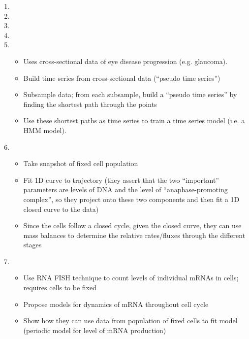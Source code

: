 \documentclass[12pt]{article}
\begin{document}
\begin{enumerate}

\item {}

\item {}

\item {}

\item {}

\item {}
\begin{itemize}
	\item Uses cross-sectional data of eye disease progression (e.g. glaucoma).
	\item Build time series from cross-sectional data (``pseudo time series'')
	\item Subsample data; from each subsample, build a ``pseudo time series'' by finding the shortest path through the points
	\item Use these shortest paths as time series to train a time series model (i.e. a HMM model).
\end{itemize}

\item {}
\begin{itemize}
	\item Take snapshot of fixed cell population
	\item Fit 1D curve to trajectory (they assert that the two ``important'' parameters are levels of DNA and the level of ``anaphase-promoting complex'', so they project onto these two components and then fit a 1D closed curve to the data)
	\item Since the cells follow a closed cycle, given the closed curve, they can use mass balances to determine the relative rates/fluxes through the different stages
\end{itemize}

\item {}

\begin{itemize}
	\item Use RNA FISH technique to count levels of individual mRNAs in cells; requires cells to be fixed
	\item Propose models for dynamics of mRNA throughout cell cycle
	\item Show how they can use data from population of fixed cells to fit model (periodic model for level of mRNA production)
\end{itemize}


\end{enumerate}
\end{document}
